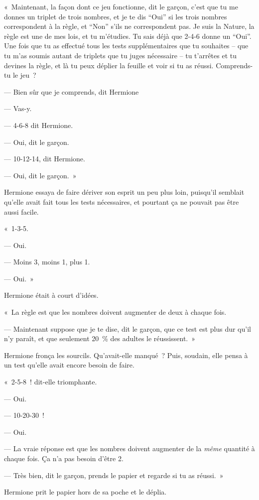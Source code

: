 «~Maintenant, la façon dont ce jeu fonctionne, dit le garçon, c'est que tu me donnes un triplet de trois nombres, et je te dis “Oui” si les trois nombres correspondent à la règle, et “Non” s'ils ne correspondent pas. Je suis la Nature, la règle est une de mes lois, et tu m'étudies. Tu sais déjà que 2-4-6 donne un “Oui”. Une fois que tu as effectué tous les tests supplémentaires que tu souhaites -- que tu m'as soumis autant de triplets que tu juges nécessaire -- tu t'arrêtes et tu devines la règle, et là tu peux déplier la feuille et voir si tu as réussi. Comprends-tu le jeu~?

--- Bien sûr que je comprends, dit Hermione

--- Vas-y.

--- 4-6-8 dit Hermione.

--- Oui, dit le garçon.

--- 10-12-14, dit Hermione.

--- Oui, dit le garçon.~»

Hermione essaya de faire dériver son esprit un peu plus loin, puisqu'il semblait qu'elle avait fait tous les tests nécessaires, et pourtant ça ne pouvait pas être aussi facile.

«~1-3-5.

--- Oui.

--- Moins 3, moins 1, plus 1.

--- Oui.~»

Hermione était à court d'idées.

«~La règle est que les nombres doivent augmenter de deux à chaque fois.

--- Maintenant suppose que je te dise, dit le garçon, que ce test est plus dur qu'il n'y paraît, et que seulement 20~\% des adultes le réussissent.~»

Hermione fronça les sourcils. Qu'avait-elle manqué~? Puis, soudain, elle pensa à un test qu'elle avait encore besoin de faire.

«~2-5-8~! dit-elle triomphante.

--- Oui.

--- 10-20-30~!

--- Oui.

--- La vraie réponse est que les nombres doivent augmenter de la \emph{même} quantité à chaque fois. Ça n'a pas besoin d'être 2.

--- Très bien, dit le garçon, prends le papier et regarde si tu as réussi.~»

Hermione prit le papier hors de sa poche et le déplia.

